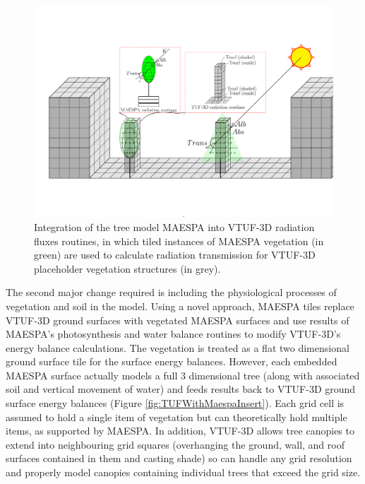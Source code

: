 \documentclass[final,3p,times,authoryear]{elsarticle}
\begin{document}
\begin{figure}[!htbp]
 \includegraphics[trim = 35mm 75mm 5mm 81mm, clip, scale=0.28]{images/TUFWithMaespaVegRadiation.png} 
 \caption{Integration of the tree model MAESPA into VTUF-3D radiation fluxes routines, in which tiled instances of MAESPA vegetation (in green) are used to calculate radiation transmission for VTUF-3D placeholder vegetation structures (in grey)\label{fig:TUFWithMaespaVegRadiation}.}\end{figure}

The second major change required is including the physiological processes of vegetation and soil in the model. Using a novel approach, MAESPA tiles replace VTUF-3D ground surfaces with vegetated MAESPA surfaces and use results of MAESPA's photosynthesis and water balance routines to modify VTUF-3D's energy balance calculations. The vegetation is treated as a flat two dimensional ground surface tile for the surface energy balances. However, each embedded MAESPA surface actually models a full 3 dimensional tree (along with associated soil and vertical movement of water) and feeds results back to VTUF-3D ground surface energy balances (Figure \ref{fig:TUFWithMaespaInsert}). Each grid cell is assumed to hold a single item of vegetation but can theoretically hold multiple items, as supported by MAESPA. In addition, VTUF-3D allows tree canopies to extend into neighbouring grid squares (overhanging the ground, wall, and roof surfaces contained in them and casting shade) so can handle any grid resolution and properly model canopies containing individual trees that exceed the grid size.  
\end{document}
